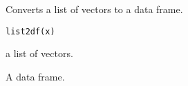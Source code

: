 
%
\begin{Description}
Converts a list of vectors to a data frame.
\end{Description}
%
\begin{Usage}
\begin{verbatim}
list2df(x)
\end{verbatim}
\end{Usage}
%
\begin{Arguments}
\begin{ldescription}
\item[\code{x}] a list of vectors.
\end{ldescription}
\end{Arguments}
%
\begin{Value}
A data frame.
\end{Value}


